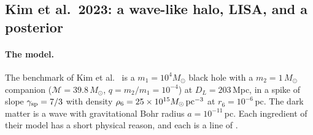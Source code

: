 \subsection{Kim et al.\ 2023: a wave-like halo, LISA, and a posterior}
\label{10b:sec:kim}

\paragraph{The model.} The benchmark of Kim et al.\ \cite[Table~I]{Kim2023} is a $m_1=10^4M_\odot$ black hole with a
$m_2=1\,M_\odot$ companion ($\mathcal M=39.8\,M_\odot$, $q=m_2/m_1=10^{-4}$) at $D_L=203$\,Mpc, in a spike of slope
$\gamma_{\rm sp}=7/3$ with density $\rho_6=25\times10^{15}M_\odot\,{\rm pc}^{-3}$ at $r_6=10^{-6}$\,pc. The dark matter
is a wave with gravitational Bohr radius $a=10^{-11}$\,pc. Each ingredient of their model has a short physical
reason, and each is a line of .
